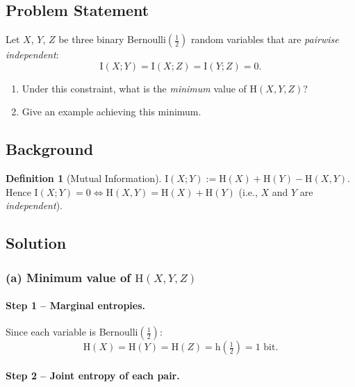 \documentclass[12pt,a4paper]{article}
\theoremstyle{plain}
\theoremstyle{definition}
\newtheorem{definition}[theorem]{Definition}
\theoremstyle{remark}
\newcommand{\HH}{\mathrm{H}}
\newcommand{\hb}{\mathrm{h}}          %
\newcommand{\II}{\mathrm{I}}
\begin{document}
\subsection*{Problem Statement}

Let $X$, $Y$, $Z$ be three binary Bernoulli$(\tfrac{1}{2})$ random variables
that are \emph{pairwise independent}:
\[
  \II(X;Y) = \II(X;Z) = \II(Y;Z) = 0.
\]

\begin{enumerate}[label=\textbf{(\alph*)}]
  \item Under this constraint, what is the \emph{minimum} value of $\HH(X,Y,Z)$?
  \item Give an example achieving this minimum.
\end{enumerate}

\subsection*{Background}

\begin{definition}[Mutual Information]
  $\II(X;Y) := \HH(X) + \HH(Y) - \HH(X,Y)$.
  Hence $\II(X;Y) = 0 \Longleftrightarrow \HH(X,Y) = \HH(X) + \HH(Y)$
  (i.e., $X$ and $Y$ are \emph{independent}).
\end{definition}

\subsection*{Solution}

\subsubsection*{(a) Minimum value of $\HH(X,Y,Z)$}

\paragraph{Step 1 – Marginal entropies.}

Since each variable is Bernoulli$(\tfrac{1}{2})$:
\[
  \HH(X) = \HH(Y) = \HH(Z) = \hb\!\left(\tfrac{1}{2}\right) = 1\text{ bit}.
\]

\paragraph{Step 2 – Joint entropy of each pair.}
\end{document}

